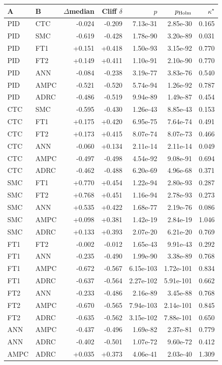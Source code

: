 \begin{tabular}{llrrrrr}
\toprule
A & B & $\Delta$median & Cliff $\delta$ & $p$ & $p_{\rm Holm}$ & $\kappa^\star$ \\
\midrule
PID & CTC & -0.024 & -0.209 & 7.13e-31 & 2.85e-30 & 0.165 \\
PID & SMC & -0.619 & -0.428 & 1.78e-90 & 3.20e-89 & 0.031 \\
PID & FT1 & +0.151 & +0.418 & 1.50e-93 & 3.15e-92 & 0.770 \\
PID & FT2 & +0.149 & +0.411 & 1.10e-91 & 2.10e-90 & 0.770 \\
PID & ANN & -0.084 & -0.238 & 3.19e-77 & 3.83e-76 & 0.540 \\
PID & AMPC & -0.521 & -0.520 & 5.74e-94 & 1.26e-92 & 0.787 \\
PID & ADRC & -0.486 & -0.519 & 9.94e-89 & 1.49e-87 & 0.454 \\
CTC & SMC & -0.595 & -0.430 & 1.26e-43 & 8.85e-43 & 0.153 \\
CTC & FT1 & +0.175 & +0.420 & 6.95e-75 & 7.64e-74 & 0.491 \\
CTC & FT2 & +0.173 & +0.415 & 8.07e-74 & 8.07e-73 & 0.466 \\
CTC & ANN & -0.060 & +0.134 & 2.11e-14 & 2.11e-14 & 0.049 \\
CTC & AMPC & -0.497 & -0.498 & 4.54e-92 & 9.08e-91 & 0.694 \\
CTC & ADRC & -0.462 & -0.488 & 6.20e-69 & 4.96e-68 & 0.371 \\
SMC & FT1 & +0.770 & +0.454 & 1.22e-94 & 2.80e-93 & 0.287 \\
SMC & FT2 & +0.768 & +0.451 & 1.16e-94 & 2.78e-93 & 0.273 \\
SMC & ANN & +0.535 & +0.422 & 1.68e-77 & 2.19e-76 & 0.086 \\
SMC & AMPC & +0.098 & +0.381 & 1.42e-19 & 2.84e-19 & 1.046 \\
SMC & ADRC & +0.133 & +0.393 & 2.07e-20 & 6.21e-20 & 0.769 \\
FT1 & FT2 & -0.002 & -0.012 & 1.65e-43 & 9.91e-43 & 0.292 \\
FT1 & ANN & -0.235 & -0.490 & 1.99e-90 & 3.38e-89 & 0.768 \\
FT1 & AMPC & -0.672 & -0.567 & 6.15e-103 & 1.72e-101 & 0.834 \\
FT1 & ADRC & -0.637 & -0.564 & 2.27e-102 & 5.91e-101 & 0.662 \\
FT2 & ANN & -0.233 & -0.486 & 2.16e-89 & 3.45e-88 & 0.768 \\
FT2 & AMPC & -0.670 & -0.565 & 7.94e-103 & 2.14e-101 & 0.845 \\
FT2 & ADRC & -0.635 & -0.562 & 3.15e-102 & 7.88e-101 & 0.650 \\
ANN & AMPC & -0.437 & -0.496 & 1.69e-82 & 2.37e-81 & 0.779 \\
ANN & ADRC & -0.402 & -0.501 & 1.07e-72 & 9.60e-72 & 0.412 \\
AMPC & ADRC & +0.035 & +0.373 & 4.06e-41 & 2.03e-40 & 1.309 \\
\bottomrule
\end{tabular}

